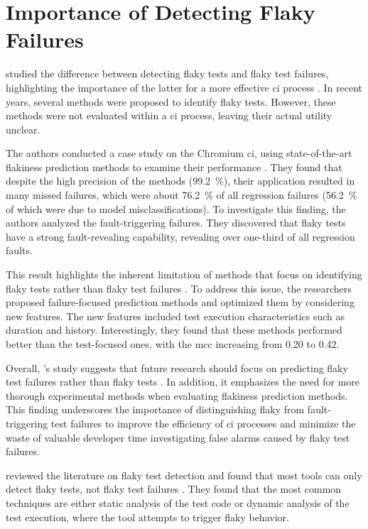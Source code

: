 \section{Importance of Detecting Flaky Failures}
 studied the difference between detecting flaky tests and flaky test failures, highlighting the importance of the latter for a more effective \ac{ci} process \autocite{haben_importance_2023}.
In recent years, several methods were proposed to identify flaky tests.
However, these methods were not evaluated within a \ac{ci} process, leaving their actual utility unclear.

The authors conducted a case study on the Chromium \ac{ci}, using state-of-the-art flakiness prediction methods to examine their performance \autocite{haben_importance_2023}.
They found that despite the high precision of the methods (\SI{99.2}{\percent}), their application resulted in many missed failures, which were about \SI{76.2}{\percent} of all regression failures (\SI{56.2}{\percent} of which were due to model misclassifications).
To investigate this finding, the authors analyzed the fault-triggering failures. They discovered that flaky tests have a strong fault-revealing capability, revealing over one-third of all regression faults.

This result highlights the inherent limitation of methods that focus on identifying flaky tests rather than flaky test failures \autocite{haben_importance_2023}.
To address this issue, the researchers proposed failure-focused prediction methods and optimized them by considering new features.
The new features included test execution characteristics such as duration and history.
Interestingly, they found that these methods performed better than the test-focused ones, with the \ac{mcc} increasing from \num{0.20} to \num{0.42}.

Overall, \citeauthor*{haben_importance_2023}'s study suggests that future research should focus on predicting flaky test failures rather than flaky tests \autocite{haben_importance_2023}.
In addition, it emphasizes the need for more thorough experimental methods when evaluating flakiness prediction methods.
This finding underscores the importance of distinguishing flaky from fault-triggering test failures to improve the efficiency of \ac{ci} processes and minimize the waste of valuable developer time investigating false alarms caused by flaky test failures.

 reviewed the literature on flaky test detection and found that most tools can only detect flaky tests, not flaky test failures \autocite{rasheed_test_2022}.
They found that the most common techniques are either static analysis of the test code or dynamic analysis of the test execution, where the tool attempts to trigger flaky behavior.
